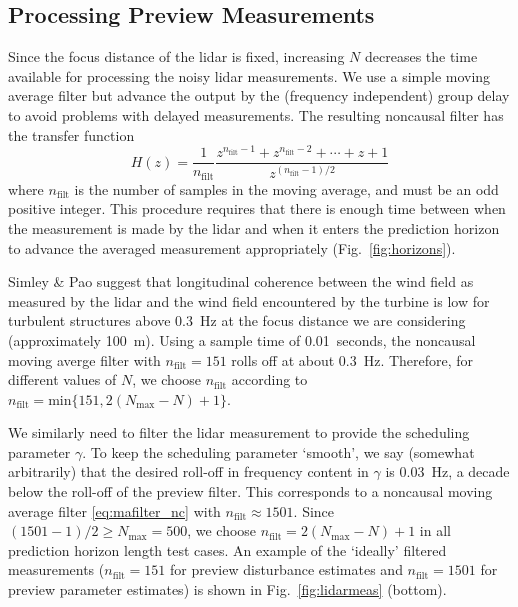 \documentclass[letterpaper, 10 pt, conference]{ieeeconf}  %
\begin{document}
\subsection{Processing Preview Measurements}

Since the focus distance of the lidar is fixed, increasing $N$ decreases the time available for processing the noisy lidar measurements. We use a simple moving average filter but advance the output by the (frequency independent) group delay to avoid problems with delayed measurements. The resulting noncausal filter has the transfer function
\begin{equation}\label{eq:mafilter_nc}
H(z) = \frac{1}{n_\mathrm{filt}}\frac{z^{n_\mathrm{filt}-1} + z^{n_\mathrm{filt}-2} + \cdots + z + 1}{z^{\left(n_\mathrm{filt}-1\right)/2}} 
\end{equation}
where $n_\mathrm{filt}$ is the number of samples in the moving average, and must be an odd positive integer. This procedure requires that there is enough time between when the measurement is made by the lidar and when it enters the prediction horizon to advance the averaged measurement appropriately (Fig.~\ref{fig:horizons}).

Simley \& Pao \cite{SimleyPao2015} suggest that longitudinal coherence between the wind field as measured by the lidar and the wind field encountered by the turbine is low for turbulent structures above 0.3~Hz at the focus distance we are considering (approximately 100~m). Using a sample time of 0.01~seconds, the noncausal moving averge filter with $n_\mathrm{filt} = 151$ rolls off at about 0.3~Hz. Therefore, for different values of $N$, we choose $n_\mathrm{filt}$ according to $n_\mathrm{filt} = \mathrm{min}\{151, 2(N_\mathrm{max} - N)+1\}$.

We similarly need to filter the lidar measurement to provide the scheduling parameter $\gamma$. To keep the {\color{black}scheduling parameter `smooth', we say (somewhat arbitrarily) that the desired roll-off in frequency content in $\gamma$ is 0.03~Hz}, a decade below the roll-off of the preview filter. This corresponds to a noncausal moving average filter \eqref{eq:mafilter_nc} with $n_\mathrm{filt} \approx 1501$. Since $(1501-1)/2 \geq N_\mathrm{max} = 500$, we choose $n_\mathrm{filt} = 2(N_\mathrm{max} - N)+1$ in all prediction horizon length test cases. An example of the `ideally' filtered measurements ($n_\mathrm{filt} = 151$ for preview disturbance estimates and $n_\mathrm{filt} = 1501$ for preview parameter estimates) is shown in Fig.~\ref{fig:lidarmeas} (bottom). 
\end{document}
